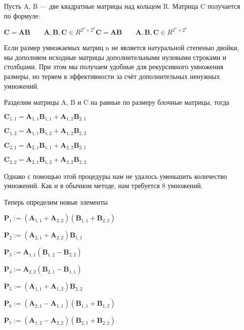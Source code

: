\documentclass{report}
\begin{document}
Пусть A, B — две квадратные матрицы над кольцом R. Матрица C получается по формуле:

${\displaystyle \mathbf {C} =\mathbf {A} \mathbf {B} \qquad \mathbf {A} ,\mathbf {B} ,\mathbf {C} \in R^{2^{n}\times 2^{n}}}{\mathbf  {C}}={\mathbf  {A}}{\mathbf  {B}}\qquad {\mathbf  {A}},{\mathbf  {B}},{\mathbf  {C}}\in R^{{2^{n}\times 2^{n}}}$
\par Если размер умножаемых матриц n не является натуральной степенью двойки, мы дополняем исходные матрицы дополнительными нулевыми строками и столбцами. При этом мы получаем удобные для рекурсивного умножения размеры, но теряем в эффективности за счёт дополнительных ненужных умножений.

\par Разделим матрицы A, B и C на равные по размеру блочные матрицы, тогда

\par ${\displaystyle \mathbf {C} _{1,1}=\mathbf {A} _{1,1}\mathbf {B} _{1,1}+\mathbf {A} _{1,2}\mathbf {B} _{2,1}}$
\par ${\displaystyle \mathbf {C} _{1,2}=\mathbf {A} _{1,1}\mathbf {B} _{1,2}+\mathbf {A} _{1,2}\mathbf {B} _{2,2}}$
\par ${\displaystyle \mathbf {C} _{2,1}=\mathbf {A} _{2,1}\mathbf {B} _{1,1}+\mathbf {A} _{2,2}\mathbf {B} _{2,1}}$
\par ${\displaystyle \mathbf {C} _{2,2}=\mathbf {A} _{2,1}\mathbf {B} _{1,2}+\mathbf {A} _{2,2}\mathbf {B} _{2,2}}$

\par Однако с помощью этой процедуры нам не удалось уменьшить количество умножений. Как и в обычном методе, нам требуется 8 умножений.

Теперь определим новые элементы

\par ${\displaystyle \mathbf {P} _{1}:=(\mathbf {A} _{1,1}+\mathbf {A} _{2,2})(\mathbf {B} _{1,1}+\mathbf {B} _{2,2})}$
\par ${\displaystyle \mathbf {P} _{2}:=(\mathbf {A} _{2,1}+\mathbf {A} _{2,2})\mathbf {B} _{1,1}}$
\par ${\displaystyle \mathbf {P} _{3}:=\mathbf {A} _{1,1}(\mathbf {B} _{1,2}-\mathbf {B} _{2,2})}$
\par ${\displaystyle \mathbf {P} _{4}:=\mathbf {A} _{2,2}(\mathbf {B} _{2,1}-\mathbf {B} _{1,1})}$
\par ${\displaystyle \mathbf {P} _{5}:=(\mathbf {A} _{1,1}+\mathbf {A} _{1,2})\mathbf {B} _{2,2}}$
\par ${\displaystyle \mathbf {P} _{6}:=(\mathbf {A} _{2,1}-\mathbf {A} _{1,1})(\mathbf {B} _{1,1}+\mathbf {B} _{1,2})}$
\par ${\displaystyle \mathbf {P} _{7}:=(\mathbf {A} _{1,2}-\mathbf {A} _{2,2})(\mathbf {B} _{2,1}+\mathbf {B} _{2,2})}$
\end{document}
